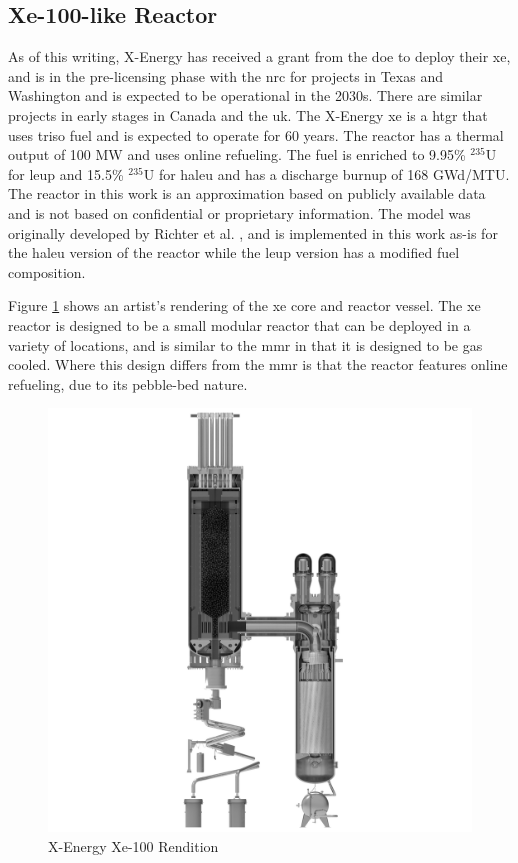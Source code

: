 \subsection{Xe-100-like Reactor}
\label{sec:xe}

As of this writing, X-Energy has received a grant from the \gls{doe} to deploy their \gls{xe}, and is in the pre-licensing phase with the \gls{nrc} for projects in Texas and Washington and is expected to be operational in the 2030s. There are similar projects in early stages in Canada and the \gls{uk}. The X-Energy \gls{xe} is a \gls{htgr} that uses \gls{triso} fuel and is expected to operate for 60 years. The reactor has a thermal output of 100 MW and uses online refueling. The fuel is enriched to 9.95\% $^{235}$U for \gls{leup} and 15.5\% $^{235}$U for \gls{haleu} and has a discharge burnup of 168 GWd/MTU. The reactor in this work is an approximation based on publicly available data and is not based on confidential or proprietary information. The model was originally developed by Richter et al. \cite{richter_xe100_like}, and is implemented in this work as-is for the \gls{haleu} version of the reactor while the \gls{leup} version has a modified fuel composition.

Figure \ref{fig:xe_design} shows an artist's rendering of the \gls{xe} core and reactor vessel. The \gls{xe} reactor is designed to be a small modular reactor that can be deployed in a variety of locations, and is similar to the \gls{mmr} in that it is designed to be gas cooled. Where this design differs from the \gls{mmr} is that the reactor features online refueling, due to its pebble-bed nature.

\begin{figure}[H]
    \centering
    \includegraphics[scale=0.09]{images/reactor_design/xe-100-reactor-slice.jpg}
    \caption{X-Energy Xe-100 Rendition \cite{xe_reactor}}
    \label{fig:xe_design}
\end{figure}

